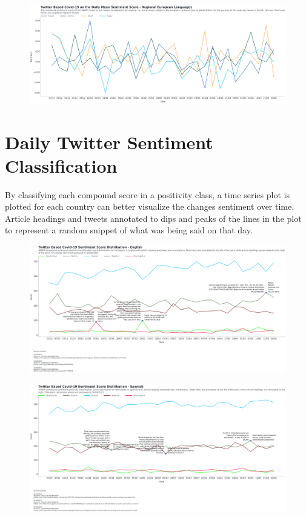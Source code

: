 \begin{landscape}
\begin{figure}[h!]
\includegraphics[scale=0.33]{Daily Mean Europe.png}
\caption[Daily Mean Europe]{ }
\label{fig:globaleu}
\end{figure}

\newpage

\section{Daily Twitter Sentiment Classification}

By classifying each compound score in a positivity class, a time series plot is plotted for each country can better visualize the changes sentiment over time.
Article headings and tweets annotated to dips and peaks of the lines in the plot to represent a random snippet of what was being said on that day.

\begin{figure}[h!]
\includegraphics[scale=0.33]{Final English Annotated Distribution.png}
\caption[English Annotated Sentiment Distribution]{ }
\label{fig:English}
\end{figure}

\begin{figure}[h!]
\includegraphics[scale=0.33]{Final Spanish Annotated Distribution.png}
\caption[English Annotated Sentiment Distribution]{ }
\label{fig:Spanish}
\end{figure}


\end{landscape}

